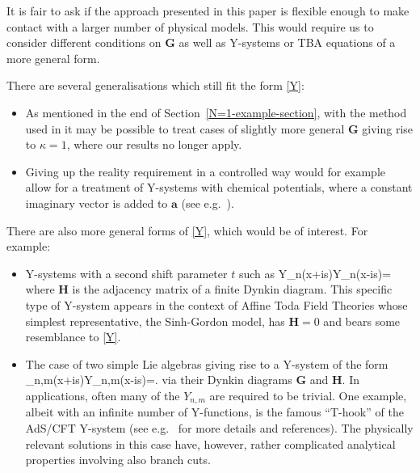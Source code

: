 \documentclass[12pt]{article}
\theoremstyle{plain}
\theoremstyle{definition}
\numberwithin{equation}{section}
\numberwithin{theorem}{section}
\def\be#1\ee{\begin{equation}#1\end{equation}}
\renewcommand{\vec}[1]{\mathbf{#1}}
\begin{document}
It is fair to ask if the approach presented in this paper is flexible enough to make contact with a larger number of physical models. This would require us to consider different conditions on $\vec{G}$ 
as well as
Y-systems or TBA equations of a more general form.

\medskip

There are several generalisations which still fit the form \eqref{Y}:
\begin{itemize}
\item 
As mentioned in the end of Section~\ref{N=1-example-section}, 
	with the method used in \cite{FringKorffSchulz}
it may be possible to treat cases of slightly more general $\vec{G}$ giving rise to $\kappa=1$, where our results
	no longer apply.
\item Giving up the reality requirement in a controlled way would
for example allow for a treatment of Y-systems with chemical potentials, where a constant imaginary vector is added to $\vec{a}$
 (see e.g.\ \cite{KlassenMelzer91,Fendley92}).
\end{itemize}

There are also more general forms of \eqref{Y}, which would be of interest. For example:
\begin{itemize}
\item Y-systems with a second shift parameter $t$ such as 
\be \label{affineToda}
Y_n(x+is)Y_n(x-is)= \,
\ee
where $\vec{H}$ is the adjacency matrix of a finite Dynkin diagram. This specific type of Y-system appears in the context of Affine Toda Field Theories \cite{Martins,FringKorffSchulz} whose simplest representative, the Sinh-Gordon model, has $\vec{H}=0$
	and bears some resemblance to \eqref{Y}.
\item The case of two simple Lie algebras giving rise to a Y-system of the form
\be
Y_{n,m}(x+is)Y_{n,m}(x-is)=.
\ee
via their Dynkin diagrams $\vec{G}$ and $\vec{H}$.
In applications, often many of the $Y_{n,m}$ are required to be trivial. One example, albeit with an infinite number of Y-functions, is the famous ``T-hook'' of the AdS/CFT Y-system 
	(see e.g.\ \cite{Bajnok:TBAreview} for more details and references). 
The physically relevant solutions in this case have, however, rather complicated analytical properties involving also branch cuts.
\end{itemize}
\end{document}
